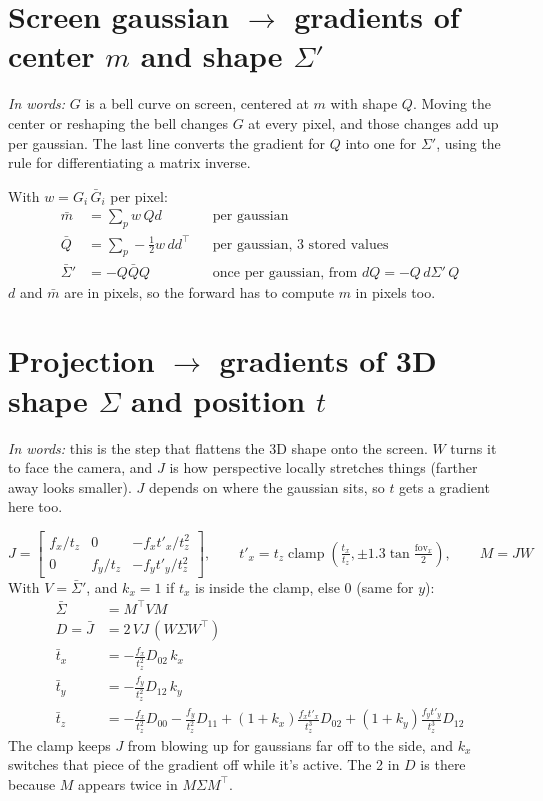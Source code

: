 \documentclass[11pt]{article}
\newcommand{\T}{^{\top}}
\newcommand{\words}[1]{\textit{In words:} #1\par}
\begin{document}
\section{Screen gaussian \texorpdfstring{$\to$}{->} gradients of center $m$ and shape \texorpdfstring{$\Sigma'$}{Sigma'}}

\words{$G$ is a bell curve on screen, centered at $m$ with shape $Q$. Moving the center or reshaping the bell changes $G$ at every pixel, and those changes add up per gaussian. The last line converts the gradient for $Q$ into one for $\Sigma'$, using the rule for differentiating a matrix inverse.}

With $w = G_i\, \bar G_i$ per pixel:
\begin{align*}
\bar m &= \textstyle\sum_p w\, Q d && \text{per gaussian} \\
\bar Q &= \textstyle\sum_p -\tfrac12 w\, d d\T && \text{per gaussian, 3 stored values} \\
\bar\Sigma' &= -Q \bar Q Q && \text{once per gaussian, from } dQ = -Q\, d\Sigma'\, Q
\end{align*}
$d$ and $\bar m$ are in pixels, so the forward has to compute $m$ in pixels too.

\section{Projection \texorpdfstring{$\to$}{->} gradients of 3D shape \texorpdfstring{$\Sigma$}{Sigma} and position \texorpdfstring{$t$}{t}}

\words{this is the step that flattens the 3D shape onto the screen. $W$ turns it to face the camera, and $J$ is how perspective locally stretches things (farther away looks smaller). $J$ depends on where the gaussian sits, so $t$ gets a gradient here too.}
\[
J = \begin{bmatrix} f_x/t_z & 0 & -f_x t'_x/t_z^2 \\ 0 & f_y/t_z & -f_y t'_y/t_z^2 \end{bmatrix},\qquad
t'_x = t_z \operatorname{clamp}\!\left(\tfrac{t_x}{t_z}, \pm 1.3\tan\tfrac{\text{fov}_x}{2}\right),\qquad M = JW
\]
With $V = \bar\Sigma'$, and $k_x = 1$ if $t_x$ is inside the clamp, else $0$ (same for $y$):
\begin{align*}
\bar\Sigma &= M\T V M \\
D = \bar J &= 2\, V J\, (W\Sigma W\T) \\
\bar t_x &= -\frac{f_x}{t_z^2} D_{02}\, k_x \\
\bar t_y &= -\frac{f_y}{t_z^2} D_{12}\, k_y \\
\bar t_z &= -\frac{f_x}{t_z^2} D_{00} - \frac{f_y}{t_z^2} D_{11} + (1+k_x)\frac{f_x t'_x}{t_z^3} D_{02} + (1+k_y)\frac{f_y t'_y}{t_z^3} D_{12}
\end{align*}
The clamp keeps $J$ from blowing up for gaussians far off to the side, and $k_x$ switches that piece of the gradient off while it's active. The 2 in $D$ is there because $M$ appears twice in $M\Sigma M\T$.
\end{document}
